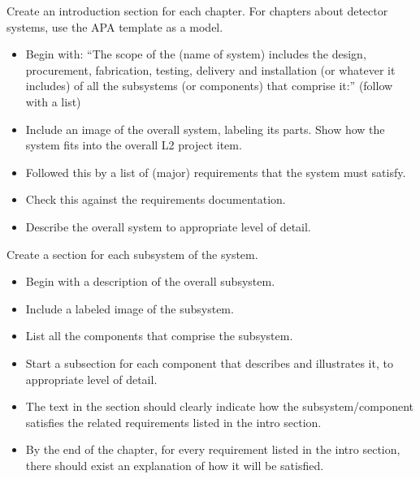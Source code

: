 Create an introduction section for each chapter.  For chapters about detector systems, use the APA template as a model.

\begin{itemize}
\item Begin with: ``The scope of the (name of system) includes the design, procurement, fabrication, testing, delivery and installation (or whatever it includes) of all the subsystems (or components) that comprise it:'' (follow with a list)
\item Include an image of the overall system, labeling its parts. Show how the system fits into the overall L2 project item.
\item Followed this by a list of (major) requirements that the system must satisfy.
\item Check this against the requirements documentation.
\item Describe the overall system to appropriate level of detail.
\end{itemize}

Create a section for each subsystem of the system.

\begin{itemize}
\item Begin with a description of the overall subsystem.
\item Include a labeled image of the subsystem.  
\item List all the components that comprise the subsystem.
\item Start a subsection for each component that describes and illustrates it, to appropriate level of detail.
\item The text in the section should clearly indicate how the subsystem/component satisfies the related requirements listed in the intro section.
\item By the end of the chapter, for every requirement listed in the intro section, there should exist an explanation of how it will be satisfied.
\end{itemize}

